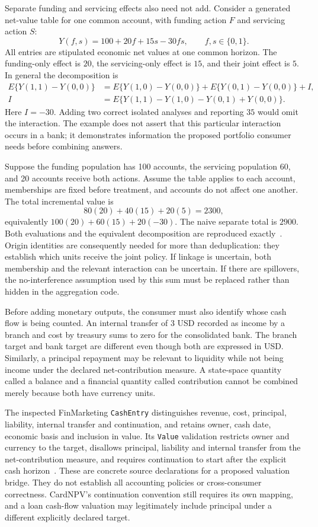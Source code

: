 Separate funding and servicing effects also need not add. Consider a
generated net-value table for one common account, with funding action $F$
and servicing action $S$:
\[
 Y(f,s)=100+20f+15s-30fs,\qquad f,s\in\{0,1\}.
\]
All entries are stipulated economic net values at one common horizon. The
funding-only effect is $20$, the servicing-only effect is $15$, and their
joint effect is $5$. In general the decomposition is
\begin{align}
 E\{Y(1,1)-Y(0,0)\}
   &=E\{Y(1,0)-Y(0,0)\}+E\{Y(0,1)-Y(0,0)\}+I,\\
 I&=E\{Y(1,1)-Y(1,0)-Y(0,1)+Y(0,0)\}.
 \label{exec13:i3-interaction}
\end{align}
Here $I=-30$. Adding two correct isolated analyses and reporting $35$
would omit the interaction. The example does not assert that this particular
interaction occurs in a bank; it demonstrates information the proposed
portfolio consumer needs before combining answers.

Suppose the funding population has 100 accounts, the servicing population
60, and 20 accounts receive both actions. Assume the table applies to each
account, memberships are fixed before treatment, and accounts do not affect
one another. The total incremental value is
\[
 80(20)+40(15)+20(5)=2300,
\]
equivalently $100(20)+60(15)+20(-30)$. The naive separate total is
$2900$. Both evaluations and the equivalent decomposition are reproduced
exactly~\citep{exec13_i3_composition}. Origin identities are consequently
needed for more than deduplication: they establish which units receive the
joint policy. If linkage is uncertain, both membership and the relevant
interaction can be uncertain. If there are spillovers, the no-interference
assumption used by this sum must be replaced rather than hidden in the
aggregation code.

Before adding monetary outputs, the consumer must also identify whose cash
flow is being counted. An internal transfer of $3$ USD recorded as income by
a branch and cost by treasury sums to zero for the consolidated bank. The
branch target and bank target are different even though both are expressed in
USD. Similarly, a principal repayment may be relevant to liquidity while not
being income under the declared net-contribution measure. A state-space
quantity called a balance and a financial quantity called contribution cannot
be combined merely because both have currency units.

The inspected FinMarketing \texttt{CashEntry} distinguishes revenue, cost,
principal, liability, internal transfer and continuation, and retains owner,
cash date, economic basis and inclusion in value. Its \texttt{Value}
validation restricts owner and currency to the target, disallows principal,
liability and internal transfer from the net-contribution measure, and
requires continuation to start after the explicit cash horizon~\citep{exec13_i3_composition}. These are concrete source declarations for a
proposed valuation bridge. They do not establish all accounting policies or
cross-consumer correctness. CardNPV's continuation convention still requires
its own mapping, and a loan cash-flow valuation may legitimately include
principal under a different explicitly declared target.

